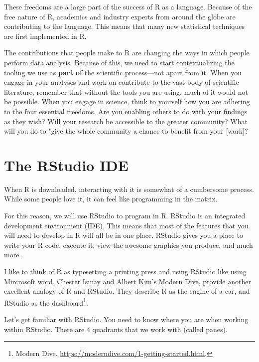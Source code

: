 \documentclass[
]{book}
\begin{document}
These freedoms are a large part of the success of R as a language. Because of the free nature of R, academics and industry experts from around the globe are contributing to the language. This means that many new statistical techniques are first implemented in R.

The contributions that people make to R are changing the ways in which people perform data analysis. Because of this, we need to start contextualizing the tooling we use as \textbf{part of} the scientific process---not apart from it. When you engage in your analyses and work on contribute to the vast body of scientific literature, remember that without the tools you are using, much of it would not be possible. When you engage in science, think to yourself how you are adhering to the four essential freedoms. Are you enabling others to do with your findings as they wish? Will your research be accessible to the greater community? What will you do to "give the whole community a chance to benefit from your {[}work{]}?

\hypertarget{the-rstudio-ide}{%
\section{The RStudio IDE}\label{the-rstudio-ide}}

When R is downloaded, interacting with it is somewhat of a cumbersome process. While some people love it, it can feel like programming in the matrix.

For this reason, we will use RStudio to program in R. RStudio is an integrated development environment (IDE). This means that most of the features that you will need to develop in R will all be in one place. RStudio gives you a place to write your R code, execute it, view the awesome graphics you produce, and much more.

I like to think of R as typesetting a printing press and using RStudio like using Mircrosoft word. Chester Ismay and Albert Kim's Modern Dive, provide another excellent analogy of R and RStudio. They describe R as the engine of a car, and RStudio as the dashboard\footnote{Modern Dive. \url{https://moderndive.com/1-getting-started.html}.}.

Let's get familiar with RStudio. You need to know where you are when working within RStudio. There are 4 quadrants that we work with (called panes).
\end{document}
